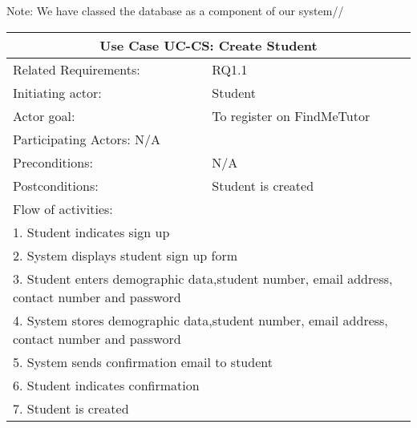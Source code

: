 \documentclass[12pt]{article}
\begin{document}
			
		{
		\centering
		
		Note: We have classed the database as a component of our system//
		\begin{tabular}{| l | l| }
			\hline\multicolumn{2}{|c|}{ \textbf{Use Case UC-CS: Create Student}} \\ \hline
			Related Requirements: & RQ1.1 \\ \hline
			Initiating actor: & Student \\ \hline
			Actor goal: & To register on FindMeTutor\\ \hline
			Participating Actors: N/A\\ \hline
			Preconditions: & N/A\\ \hline
			Postconditions: & Student is created\\ \hline
			\multicolumn{2}{|l|}{Flow of activities:}\\ \hline
			\multicolumn{2}{|p{15cm}|}{1. Student indicates sign up}\\
			\multicolumn{2}{|p{15cm}|}{2. System displays student sign up form}\\
			\multicolumn{2}{|p{15cm}|}{3. Student enters demographic data,student number, email address, contact number and password}\\		
			\multicolumn{2}{|p{15cm}|}{4. System stores demographic data,student number, email address, contact number and password}\\
			\multicolumn{2}{|l|}{5. System sends confirmation email to student}\\
			\multicolumn{2}{|l|}{6. Student indicates confirmation}	\\
			\multicolumn{2}{|l|}{7. Student is created}
			\\ \hline		
			\end{tabular}
		
		
		
}
\end{document}

